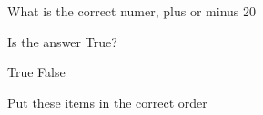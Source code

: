 \documentclass[letterpaper,10pt]{article}
\begin{document}
\begin{compactenum}
\begin{minipage}{\linewidth}
    \end{minipage}

    \vspace{10pt}

\begin{minipage}{\linewidth}
    \item \label{5} What is the correct numer, plus or minus 20%
    
    \end{minipage}

    \vspace{10pt}

\begin{minipage}{\linewidth}
    \item \label{6} Is the answer True?

        True \hskip 1cm False
    
    \end{minipage}

    \vspace{10pt}

\begin{minipage}{\linewidth}
    \item \label{7} Put these items in the correct order
    
    \end{minipage}

    \vspace{10pt}

\end{compactenum}
\end{document}
